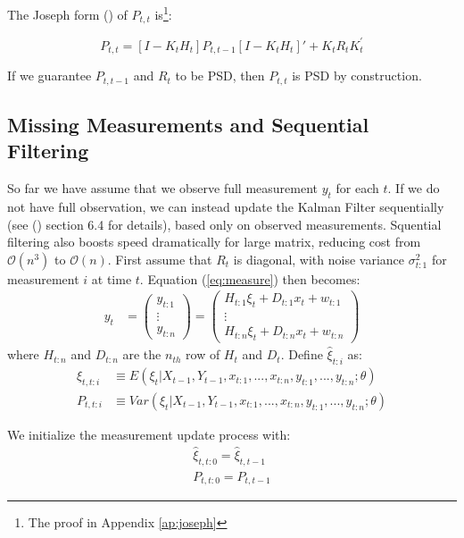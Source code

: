 \documentclass[12pt]{article}
\numberwithin{equation}{section}
\begin{document}
The Joseph form (\cite{joseph_1968}) of $P_{t,t}$ is\footnote{The proof in Appendix \ref{ap:joseph}}:

\[
    P_{t,t} = [I - K_tH_t]P_{t,t-1}[I - K_tH_t]' + K_tR_tK_t^{'}    
\]

If we guarantee $P_{t,t-1}$ and $R_t$ to be PSD, then $P_{t,t}$ is PSD by construction. 

\subsection{Missing Measurements and Sequential Filtering}

So far we have assume that we observe full measurement $y_t$ for each $t$. If we do not have full observation, we can instead update the Kalman Filter sequentially (see (\cite{durbin_koopman_2001}) section 6.4 for details), based only on observed measurements. Squential filtering also boosts speed dramatically for large matrix, reducing cost from $\mathcal{O}(n^3)$ to $\mathcal{O}(n)$. First assume that $R_t$ is diagonal, with noise variance $\sigma_{t:1}^2$ for measurement $i$ at time $t$. Equation (\ref{eq:measure}) then becomes:
\begin{align*}
    y_t &= 
    \begin{pmatrix}
        y_{t:1} \\
        \vdots \\ 
        y_{t:n}
    \end{pmatrix} 
    = \begin{pmatrix}
        H_{t:1}\xi_t + D_{t:1}x_t + w_{t:1} \\
        \vdots \\
        H_{t:n}\xi_t + D_{t:n}x_t + w_{t:n}
    \end{pmatrix}
\end{align*}
where $H_{t:n}$ and $D_{t:n}$ are the $n_{th}$ row of $H_t$ and $D_t$. Define $\hat{\xi}_{t:i}$ as:
\begin{align*}
    \hat{\xi}_{t,t:i} &\equiv E(\xi_t|X_{t-1},Y_{t-1},x_{t:1},...,x_{t:n},y_{t:1},...,y_{t:n};\theta) \\
    P_{t,t:i} &\equiv Var(\xi_t|X_{t-1},Y_{t-1},x_{t:1},...,x_{t:n},y_{t:1},...,y_{t:n};\theta) 
\end{align*}

We initialize the measurement update process with:
\begin{align}
    \hat{\xi}_{t,t:0} = \hat{\xi}_{t,t-1} \label{eq:seq_init1} \\
    P_{t,t:0} = P_{t,t-1} \label{eq:seq_init2}
\end{align}
\end{document}
